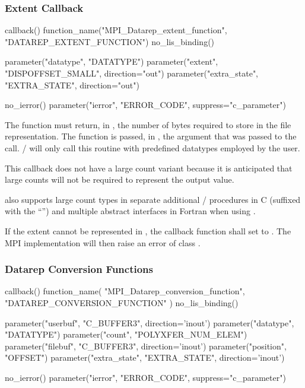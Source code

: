 \subsubsection{Extent Callback}

%
\begin{mpi-binding}
    callback()
    function_name("MPI_Datarep_extent_function", "DATAREP_EXTENT_FUNCTION")
    no_lis_binding()
    
    parameter("datatype", "DATATYPE")
    parameter("extent", "DISPOFFSET_SMALL", direction="out")
    parameter("extra_state", "EXTRA_STATE", direction="out")
    
    no_ierror()
    parameter("ierror", "ERROR_CODE", suppress="c_parameter")
\end{mpi-binding}

The function 
must return, in , the number of bytes
required to store  in the file representation.
The function is passed, in ,
the argument that was passed to the  call.
\MPI/ will only call this routine with predefined datatypes
employed by the user.

\begin{rationale}
  This callback does not have a large count variant because it is
  anticipated that large counts will not be required to represent the
   output value.
\end{rationale}

also supports large count types in separate additional
\MPI/ procedures in C (suffixed with the ``'') and
multiple abstract interfaces in Fortran when using .

If the extent cannot be represented in , the callback
function shall set  to .  The
MPI implementation will then raise an error of class
.

\subsubsection{Datarep Conversion Functions}
\label{subsec:io:conversion-callback}

%
\begin{mpi-binding}
    callback()
    function_name(
        "MPI_Datarep_conversion_function", "DATAREP_CONVERSION_FUNCTION"
    )
    no_lis_binding()
    
    parameter("userbuf", "C_BUFFER3", direction='inout')
    parameter("datatype", "DATATYPE")
    parameter("count", "POLYXFER_NUM_ELEM")
    parameter("filebuf", "C_BUFFER3", direction='inout')
    parameter("position", "OFFSET")
    parameter("extra_state", "EXTRA_STATE", direction='inout')
    
    no_ierror()
    parameter("ierror", "ERROR_CODE", suppress="c_parameter")
\end{mpi-binding}


